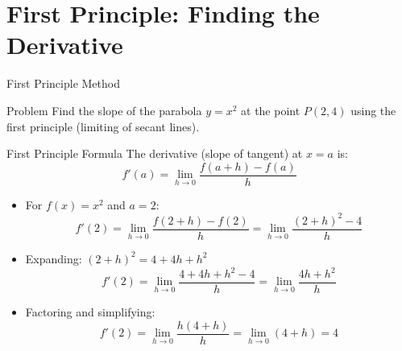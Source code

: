 \documentclass{beamer}
\begin{document}
\section{First Principle: Finding the Derivative}

\begin{frame}{First Principle Method}
  \begin{block}{Problem}
    Find the slope of the parabola $y = x^2$ at the point $P(2, 4)$ using the first principle (limiting of secant lines).
  \end{block}
  
  \begin{block}{First Principle Formula}
    The derivative (slope of tangent) at $x = a$ is:
    \[ f'(a) = \lim_{h \to 0} \frac{f(a+h) - f(a)}{h} \]
  \end{block}
  
  \begin{itemize}
    \item<2-> For $f(x) = x^2$ and $a = 2$:
    \[ f'(2) = \lim_{h \to 0} \frac{f(2+h) - f(2)}{h} = \lim_{h \to 0} \frac{(2+h)^2 - 4}{h} \]
    
    \item<3-> Expanding: $(2+h)^2 = 4 + 4h + h^2$
    \[ f'(2) = \lim_{h \to 0} \frac{4 + 4h + h^2 - 4}{h} = \lim_{h \to 0} \frac{4h + h^2}{h} \]
    
    \item<4-> Factoring and simplifying:
    \[ f'(2) = \lim_{h \to 0} \frac{h(4 + h)}{h} = \lim_{h \to 0} (4 + h) = 4 \]
  \end{itemize}
\end{frame}
\end{document}
